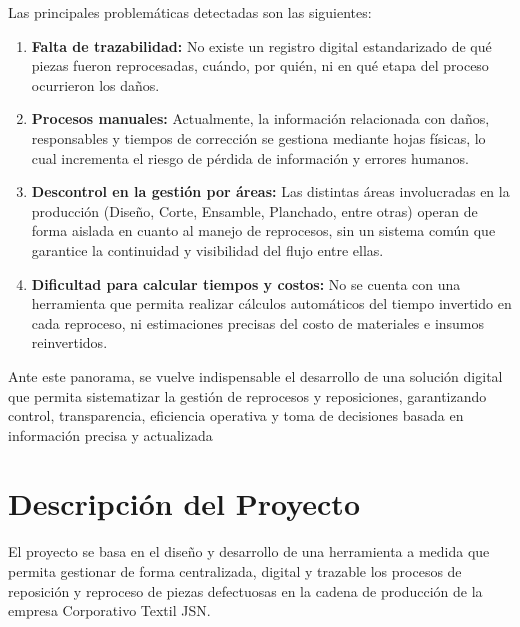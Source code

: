\documentclass[12pt,letterpaper,spanish]{report}
\begin{document}
Las principales problemáticas detectadas son las siguientes:

\begin{enumerate}
    \item \textbf{Falta de trazabilidad:} No existe un registro digital estandarizado de qué piezas fueron reprocesadas, cuándo, por quién, ni en qué etapa del proceso ocurrieron los daños.
    
    \item \textbf{Procesos manuales:} Actualmente, la información relacionada con daños, responsables y tiempos de corrección se gestiona mediante hojas físicas, lo cual incrementa el riesgo de pérdida de información y errores humanos.
    
    \item \textbf{Descontrol en la gestión por áreas:} Las distintas áreas involucradas en la producción (Diseño, Corte, Ensamble, Planchado, entre otras) operan de forma aislada en cuanto al manejo de reprocesos, sin un sistema común que garantice la continuidad y visibilidad del flujo entre ellas.
    
    \item \textbf{Dificultad para calcular tiempos y costos:} No se cuenta con una herramienta que permita realizar cálculos automáticos del tiempo invertido en cada reproceso, ni estimaciones precisas del costo de materiales e insumos reinvertidos.

\end{enumerate}

Ante este panorama, se vuelve indispensable el desarrollo de una solución digital que permita sistematizar la gestión de reprocesos y reposiciones, garantizando control, transparencia, eficiencia operativa y toma de decisiones basada en información precisa y actualizada



\section{Descripción del Proyecto}

El proyecto se basa en el diseño y desarrollo de una herramienta a medida que permita gestionar de forma centralizada, digital y trazable los procesos de reposición y reproceso de piezas defectuosas en la cadena de producción de la empresa Corporativo Textil JSN.
\end{document}
